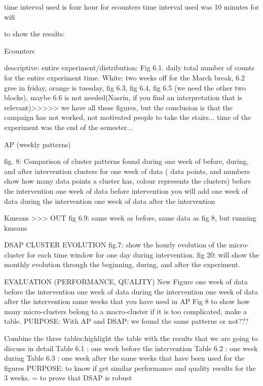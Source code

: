 time interval used is four hour for ecounters
time interval used was 10 minutes for wifi



to show the results:

Ecounters 

descriptive: entire experiment/distribution: Fig 6.1. daily total number of counts for the entire experiment time. White: two weeks off for the March break, 6.2 gree in friday, orange is tuesday, fig 6.3, fig 6.4,  fig 6.5 (we need the other two blocks), maybe 6.6 is not needed(Nasrin, if you find an interpretation that is relevant)>>>>> we have all these figures, but the conclusion is that the campaign has not worked, not motivated people to take the stairs... time of the experiment was the end of the semester...

AP (weekly patterns)

fig. 8: Comparison of cluster patterns found during one week of before, during, and after intervention
clusters for one week of data ( data points, and numbers show how many data points a cluster has, colour represents the clusters) before the intervention 
one week of data before intervention
you will add
one week of data during the intervention
one week of data after the intervention

Kmeans >>>  OUT
fig 6.9: same week as before, same data as fig 8, but running kmeans


DSAP
CLUSTER EVOLUTION
fig.7: show the hourly evolution of the micro-cluster for each time window for one day during intervention.
fig 20: will show the monthly evolution through the beginning, during, and after the experiment. 

EVALUATION (PERFORMANCE, QUALITY)
New Figure
one week of data before the intervention
one week of data during the intervention
one week of data after the intervention
same weeks that you have used in AP Fig 8
to show how many micro-clusters belong to a macro-cluster
if it is too complicated, make a table.
PURPOSE: With AP and DSAP: we found the same patterns or not???

Combine the three tables:highlight the table with the results that we are going to discuss in detail
Table 6.1 : one week before the intervention
Table 6.2  : one week during
Table 6.3 : one week after
the same weeks that have been used for the figures
PURPOSE: to know if get similar performance and quality results for the 3 weeks. = to prove that DSAP is robust








